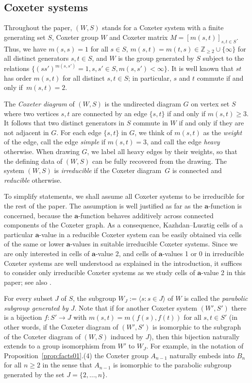 \documentclass[ALCO,Unicode,published]{cedram}
\newcommand{\Z}{\mathbb{Z}}
\newcommand{\la}{\mathbf{a}}
\newcommand{\ra}{\rightarrow}
\newcommand{\ip}[1]{\langle#1\rangle}
\begin{document}
\subsection{Coxeter systems}
\label{sec:CoxeterSystems}
Throughout the paper, $(W,S)$ stands for a Coxeter system with a finite generating set $S$, Coxeter
group $W$ and Coxeter matrix $M=[m(s,t)]_{s,t\in S}$. Thus, we have $m(s,s)=1$ for all $s\in S$,
$m(s,t)=m(t,s)\in \Z_{\ge 2}\cup\{\infty\}$ for all distinct generators $s,t\in S$, and $W$ is the
group generated by $S$ subject to the relations $\{(ss')^{m(s,s')}=1, s,s'\in S, m(s,s')<\infty\}$.
It is well known that $st$ has order $m(s,t)$ for all distinct $s,t\in S$; in particular, $s$ and
$t$ commute if and only if~$m(s,t)=2$. 

The \emph{Coxeter diagram} of $(W,S)$ is the undirected diagram $G$ on vertex set $S$ where two
vertices $s,t$ are connected by an edge $\{s,t\}$ if and only if $m(s,t)\ge 3$. It follows that two
distinct generators in $S$ commute in $W$ if and only if they are not adjacent in $G$. For each edge
$\{s,t\}$ in $G$, we think of $m(s,t)$ as the \emph{weight} of the edge, call the edge \emph{simple}
if $m(s,t)=3$, and call the edge \emph{heavy} otherwise.  When drawing $G$, we label all heavy edges
by their weights, so that the defining data of $(W,S)$ can be fully recovered from the drawing.  The
system $(W,S)$ is \emph{irreducible} if the Coxeter diagram~$G$ is connected and \emph{reducible}
otherwise. 

\begin{remark}
\label{rmk:irreducible}
To simplify statements, we shall assume all Coxeter systems to be irreducible for the rest of the
paper.  The assumption is well justified as far as the $\la$-function is concerned, because the
$\la$-function behaves additively across connected components of the Coxeter graph. As a
consequence, Kazhdan--Lusztig cells of a particular $\la$-value in a reducible Coxeter system can be
easily obtained via cells of the same or lower $\la$-values in suitable irreducible Coxeter systems.
Since we are only interested in cells of $\la$-value 2, and cells of $\la$-values 1 or 0 in
irreducible Coxeter systems are well understood as explained in the introduction, it suffices to
consider only irreducible Coxeter systems as we study cells of $\la$-value 2 in this paper; see also
\cite[Theorem 1.3]{GreenXu}.
\end{remark}

For every subset $J$ of $S$, the subgroup $W_J:=\ip{s:s\in J}$ of $W$ is called the \emph{parabolic
subgroup generated by $J$}. Note that if for another Coxeter system $(W',S')$ there is a bijection
$f: S'\ra J$ with $m(s,t)=m(f(s),f(t))$ for all $s,t\in S'$ (in other words, if the Coxeter diagram
of $(W',S')$ is isomorphic to the subgraph of the Coxeter diagram of $(W,S)$ induced by $J$), then
this bijection naturally extends to a group isomorphism from $W'$ to $W_J$. For example, in the
notation of Proposition~\ref{prop:facts01}.(4) the Coxeter group $A_{n-1}$ naturally embeds into $B_{n}$ for
all $n\ge 2$ in the sense that $A_{n-1}$ is isomorphic to the parabolic subgroup generated by the
set $J=\{2,\dots,n\}$. 
\end{document}
